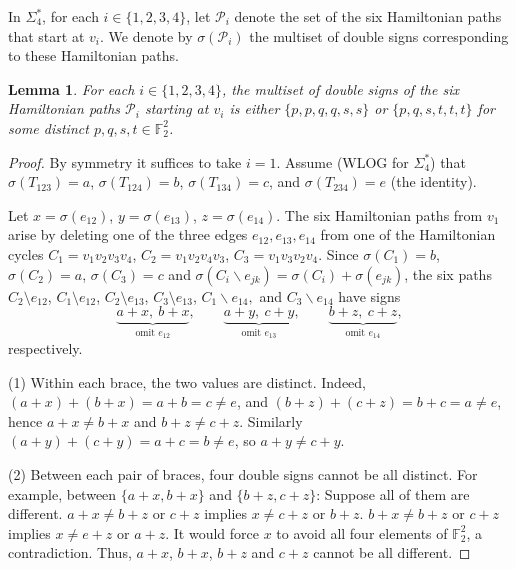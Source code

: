 \documentclass[12pt]{amsart}
\theoremstyle{plain}
\newtheorem{lemma}[theorem]{Lemma}
\theoremstyle{definition}%
\begin{document}
\vspace{2cm}


In $\Sigma_4^*$, for each $i\in\{1,2,3,4\}$, let $\mathscr{P}_i$ denote the set of the six Hamiltonian paths that start at $v_i$. We denote by $\sigma(\mathscr{P}_i)$ the multiset of double signs corresponding to these Hamiltonian paths.




\begin{lemma}\label{lemma4}
For each \(i\in\{1,2,3,4\}\), the multiset of double signs of the six Hamiltonian paths
\(\mathscr{P}_i\) starting at \(v_i\) is either
\(\{p,p,q,q,s,s\}\) or \(\{p,q,s,t,t,t\}\) for some distinct
\(p,q,s,t\in\mathbb F_2^2\).
\end{lemma}

\begin{proof}
By symmetry it suffices to take \(i=1\).
Assume (WLOG for \(\Sigma_4^*\)) that
\(\sigma(T_{123})=a\), \(\sigma(T_{124})=b\), \(\sigma(T_{134})=c\), and
\(\sigma(T_{234})=e\) (the identity). 

Let \(x=\sigma(e_{12})\), \(y=\sigma(e_{13})\), \(z=\sigma(e_{14})\).
The six Hamiltonian paths from \(v_1\) arise by deleting one of the three
edges \(e_{12},e_{13},e_{14}\) from one of the Hamiltonian cycles
\(C_1=v_1v_2v_3v_4\), \(C_2=v_1v_2v_4v_3\), \(C_3=v_1v_3v_2v_4\).
Since \(\sigma(C_1)=b\), \(\sigma(C_2)=a\), \(\sigma(C_3)=c\) and $\sigma(C_i\backslash e_{jk})=\sigma(C_i)+\sigma(e_{jk})$,
the six paths   \(C_{2}\setminus e_{12}\), \(C_{1}\setminus e_{12}\),
\(C_{2}\setminus e_{13}\),  \(C_{3}\setminus e_{13}\), $C_1\backslash e_{14},$ and $ C_3\backslash e_{14}$ 
have signs 
\[
\underbrace{a+x,\ b+x}_{\text{omit }e_{12}},\qquad
\underbrace{a+y,\ c+y}_{\text{omit }e_{13}},\qquad
\underbrace{b+z,\ c+z}_{\text{omit }e_{14}},
\] respectively.

(1) Within each brace, the two values are distinct.
Indeed,
\((a+x)+(b+x)=a+b=c\neq e\), and \((b+z)+(c+z)=b+c=a\neq e\), hence
\(a+x\ne b+x\) and \(b+z\ne c+z\). Similarly \((a+y)+(c+y)=a+c=b\ne e\), so
\(a+y\ne c+y\).

(2) Between each pair of braces, four double signs cannot be all distinct. 
For example, between \(\{a+x,b+x\}\) and \(\{b+z,c+z\}\):  Suppose all of them are different. $a+x\neq b+z$ or $c+z$ implies $x\neq c+z$ or $b+z$. $b+x\neq b+z$ or $c+z$ implies $x\neq e+z$ or $a+z$. It would force 
$x$ to avoid all four elements of $\mathbb{F}_2^2$, a contradiction. Thus, $a+x$, $b+x$, $b+z$ and $c+z$ cannot be all different.



\end{proof}
\end{document}
